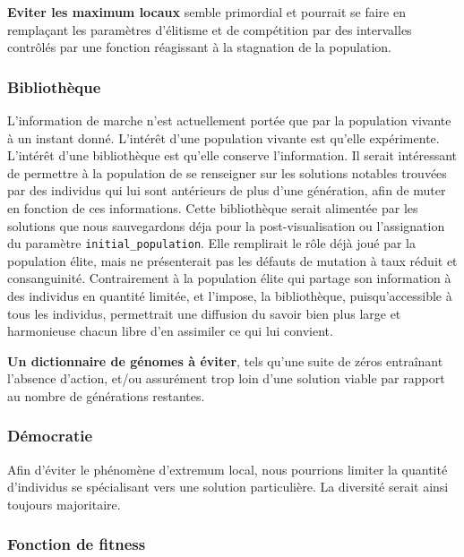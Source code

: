 \documentclass[journal, a4paper]{IEEEtran}
\begin{document}
	\textbf{Eviter les maximum locaux} semble primordial et pourrait
	se faire en remplaçant les paramètres
	d'élitisme et de compétition par des intervalles contrôlés par une
	fonction réagissant à la stagnation de la population.

\subsubsection{Bibliothèque}
	L'information de marche n'est actuellement portée que par la
	population vivante à un instant donné. L'intérêt d'une population
	vivante est qu'elle expérimente. L'intérêt d'une bibliothèque
	est qu'elle conserve l'information.
	Il serait	intéressant de permettre à la population de se
	renseigner sur les solutions notables trouvées par des individus
	qui lui sont antérieurs de plus d'une génération, afin de muter
	en fonction de ces informations.
	Cette bibliothèque serait alimentée par les solutions que nous
	sauvegardons
	déja pour la post-visualisation ou l'assignation du paramètre
	\texttt{initial\_population}.
	Elle remplirait le rôle déjà joué par la population élite, mais
	ne présenterait pas les défauts de mutation à taux réduit et
	consanguinité.
	Contrairement à la population élite qui partage son information à
	des individus en quantité limitée, et l'impose, la bibliothèque,
	puisqu'accessible à tous les individus, permettrait une diffusion
	du savoir bien plus large et harmonieuse chacun libre d'en
	assimiler
	ce qui lui convient.

	\textbf{Un dictionnaire de génomes à éviter}, tels qu'une suite
	de zéros
	entraînant l'absence d'action, et/ou assurément trop loin d'une
	solution viable par rapport au nombre de générations restantes.

\subsubsection{Démocratie}
	Afin d'éviter le phénomène d'extremum local, nous pourrions limiter
	la quantité d'individus se spécialisant vers une solution
	particulière. La diversité serait ainsi toujours majoritaire.

\subsubsection{Fonction de fitness}
\end{document}
